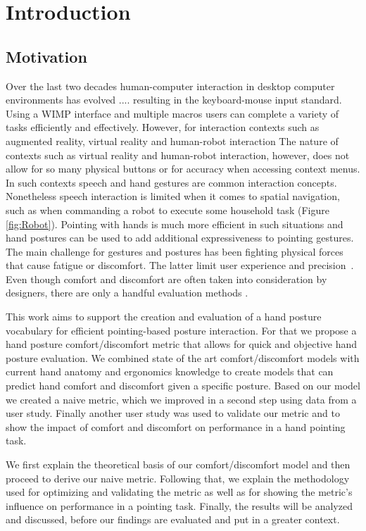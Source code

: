 
\chapter{Introduction}\label{chapter:introduction}
\section{Motivation}
Over the last two decades human-computer interaction in desktop computer environments has evolved .... resulting in the keyboard-mouse input standard. Using a WIMP interface and multiple macros users can complete a variety of tasks efficiently and effectively.
However, for interaction contexts such as augmented reality, virtual reality and human-robot interaction 
The nature of contexts such as virtual reality and human-robot interaction, however, does not allow for so many physical buttons or for accuracy when accessing context menus. In such contexts speech and hand gestures are common interaction concepts. Nonetheless speech interaction is limited when it comes to spatial navigation, such as when commanding a robot to execute some household task (Figure \ref{fig:Robot}). Pointing with hands is much more efficient in such situations and hand postures can be used to add additional expressiveness to pointing gestures. The main challenge for gestures and postures has been fighting physical forces that cause fatigue or discomfort. The latter limit user experience and precision~\cite{short1999precision}. Even though comfort and discomfort are often taken into consideration by designers, there are only a handful evaluation methods \cite{naddeo2015proposal}.

This work aims to support the creation and evaluation of a hand posture vocabulary for efficient pointing-based posture interaction. For that we propose a hand posture comfort/discomfort metric that allows for quick and objective hand posture evaluation. We combined state of the art comfort/discomfort models with current hand anatomy and ergonomics knowledge to create models that can predict hand comfort and discomfort given a specific posture. Based on our model we created a naive metric, which we improved in a second step using data from a user study. Finally another user study was used to validate our metric and to show the impact of comfort and discomfort on performance in a hand pointing task.

We first explain the theoretical basis of our comfort/discomfort model and then proceed to derive our naive metric. Following that, we explain the methodology used for optimizing and validating the metric as well as for showing the metric's influence on performance in a pointing task. Finally, the results will be analyzed and discussed, before our findings are evaluated and put in a greater context.